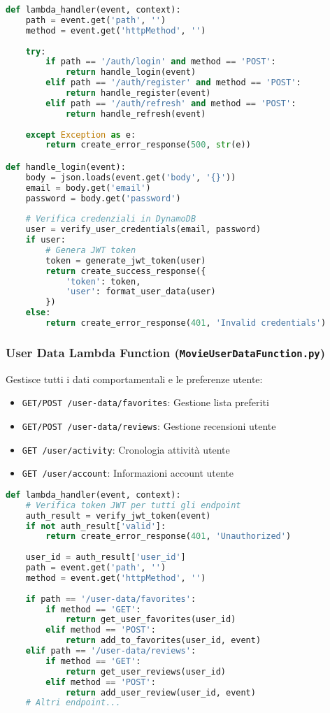 \documentclass[11pt,a4paper]{article}
\begin{document}
\begin{lstlisting}[language=Python, caption=Gestione Autenticazione]
def lambda_handler(event, context):
    path = event.get('path', '')
    method = event.get('httpMethod', '')
    
    try:
        if path == '/auth/login' and method == 'POST':
            return handle_login(event)
        elif path == '/auth/register' and method == 'POST':
            return handle_register(event)
        elif path == '/auth/refresh' and method == 'POST':
            return handle_refresh(event)
        
    except Exception as e:
        return create_error_response(500, str(e))

def handle_login(event):
    body = json.loads(event.get('body', '{}'))
    email = body.get('email')
    password = body.get('password')
    
    # Verifica credenziali in DynamoDB
    user = verify_user_credentials(email, password)
    if user:
        # Genera JWT token
        token = generate_jwt_token(user)
        return create_success_response({
            'token': token,
            'user': format_user_data(user)
        })
    else:
        return create_error_response(401, 'Invalid credentials')
\end{lstlisting}

\subsubsection{User Data Lambda Function (\texttt{MovieUserDataFunction.py})}
Gestisce tutti i dati comportamentali e le preferenze utente:

\begin{itemize}
  \item \texttt{GET/POST /user-data/favorites}: Gestione lista preferiti
  \item \texttt{GET/POST /user-data/reviews}: Gestione recensioni utente
  \item \texttt{GET /user/activity}: Cronologia attività utente
  \item \texttt{GET /user/account}: Informazioni account utente
\end{itemize}

\begin{lstlisting}[language=Python, caption=Gestione Dati Utente]
def lambda_handler(event, context):
    # Verifica token JWT per tutti gli endpoint
    auth_result = verify_jwt_token(event)
    if not auth_result['valid']:
        return create_error_response(401, 'Unauthorized')
    
    user_id = auth_result['user_id']
    path = event.get('path', '')
    method = event.get('httpMethod', '')
    
    if path == '/user-data/favorites':
        if method == 'GET':
            return get_user_favorites(user_id)
        elif method == 'POST':
            return add_to_favorites(user_id, event)
    elif path == '/user-data/reviews':
        if method == 'GET':
            return get_user_reviews(user_id)
        elif method == 'POST':
            return add_user_review(user_id, event)
    # Altri endpoint...
\end{lstlisting}
\end{document}
